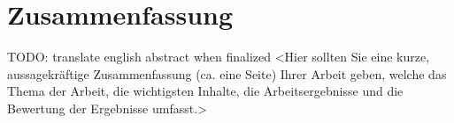 %

\chapter{Zusammenfassung}

TODO: translate english abstract when finalized
<Hier sollten Sie eine kurze, aussagekräftige Zusammenfassung (ca. eine Seite) Ihrer Arbeit geben, welche das Thema der Arbeit, die wichtigsten Inhalte, die Arbeitsergebnisse und die Bewertung der Ergebnisse umfasst.> 
